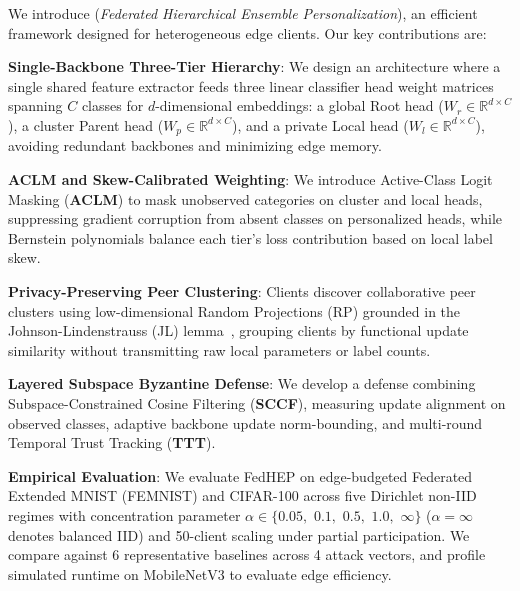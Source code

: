 We introduce \textbf{\fedhep{}} (\textit{Federated Hierarchical Ensemble Personalization}), an efficient framework designed for heterogeneous edge clients. Our key contributions are:

\noindent\textbf{Single-Backbone Three-Tier Hierarchy}: We design an architecture where a single shared feature extractor feeds three linear classifier head weight matrices spanning $C$ classes for $d$-dimensional embeddings: a global Root head ($W_r \in \mathbb{R}^{d \times C}$), a cluster Parent head ($W_p \in \mathbb{R}^{d \times C}$), and a private Local head ($W_l \in \mathbb{R}^{d \times C}$), avoiding redundant backbones and minimizing edge memory.

\noindent\textbf{ACLM and Skew-Calibrated Weighting}: We introduce Active-Class Logit Masking (\textbf{ACLM}) to mask unobserved categories on cluster and local heads, suppressing gradient corruption from absent classes on personalized heads, while Bernstein polynomials balance each tier's loss contribution based on local label skew.

\noindent\textbf{Privacy-Preserving Peer Clustering}: Clients discover collaborative peer clusters using low-dimensional Random Projections (RP) grounded in the Johnson-Lindenstrauss (JL) lemma~\cite{johnson1984extensions,woodruff2014sketching}, grouping clients by functional update similarity without transmitting raw local parameters or label counts.

\noindent\textbf{Layered Subspace Byzantine Defense}: We develop a defense combining Subspace-Constrained Cosine Filtering (\textbf{SCCF}), measuring update alignment on observed classes, adaptive backbone update norm-bounding, and multi-round Temporal Trust Tracking (\textbf{TTT}).

\noindent\textbf{Empirical Evaluation}: We evaluate FedHEP on edge-budgeted Federated Extended MNIST (FEMNIST) and CIFAR-100 across five Dirichlet non-IID regimes with concentration parameter $\alpha \in \{0.05,$ $0.1,$ $0.5,$ $1.0,$ $\infty\}$ ($\alpha=\infty$ denotes balanced IID) and 50-client scaling under partial participation. We compare against 6 representative baselines across 4 attack vectors, and profile simulated runtime on MobileNetV3 to evaluate edge efficiency.
